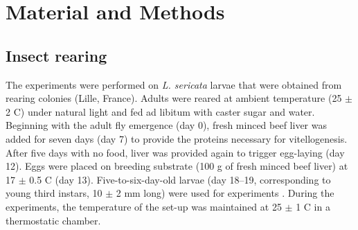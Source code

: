 	\section{Material and Methods}
        	\subsection{Insect rearing}
The experiments were performed on \textit{L. sericata} larvae that were obtained from rearing colonies (Lille, France). Adults were reared at ambient temperature (25 $\pm$ 2 C) under natural light  and fed ad libitum with caster sugar and water. Beginning with the adult fly emergence (day 0), fresh minced beef liver was added for seven days (day 7) to provide the proteins necessary for vitellogenesis. After five days with no food, liver was provided again to trigger egg-laying (day 12). Eggs were placed on breeding substrate (100 g of fresh minced beef liver) at 17 $\pm$ 0.5 C (day 13). Five-to-six-day-old larvae (day 18–19, corresponding to young third instars, 10 $\pm$ 2 mm long) were used for experiments \cite{grassberger_effect_2001}. During the experiments, the temperature of the set-up was maintained at 25 $\pm$ 1 C in a thermostatic chamber.         
    
